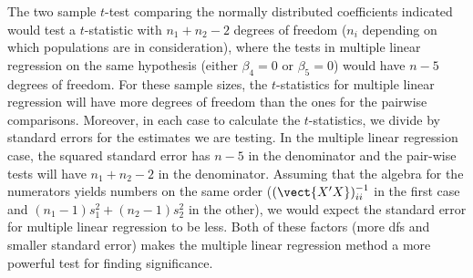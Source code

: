 \documentclass{homework}
\begin{document}
\begin{longproblem}
\begin{solution}
  The two sample $t$-test comparing the normally distributed coefficients
  indicated would test a $t$-statistic with $n_1+n_2-2$ degrees of freedom
  ($n_i$ depending on which populations are in consideration), where the tests
  in multiple linear regression on the same hypothesis (either $\beta_4 = 0$ or
  $\beta_5=0$) would have $n-5$ degrees of freedom.  For these sample sizes,
  the $t$-statistics for multiple linear regression will have more degrees of
  freedom than the ones for the pairwise comparisons.   Moreover, in each case
  to calculate the $t$-statistics, we divide by standard errors for the
  estimates we are testing.  In the multiple linear regression case, the
  squared standard error has $n-5$ in the denominator and the pair-wise tests
  will have $n_1+n_2-2$ in the denominator.  Assuming that the algebra for the
  numerators yields numbers on the same order ($(\vect{X'X})^{-1}_{ii}$ in the
  first case and $(n_1-1)s^2_1 + (n_2-1)s^2_2$ in the other), we would expect
  the standard error for multiple linear regression to be less.  Both of these
  factors (more dfs and smaller standard error) makes the multiple linear
  regression method a more powerful test for finding significance. 
\end{solution}
\end{longproblem}
\end{document}
